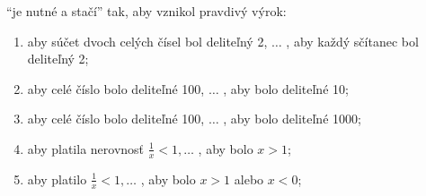 \begin{enumerate}
        \enquote{je nutné a stačí} tak, aby vznikol pravdivý výrok:
  \begin{enumerate}[label=\arabic*.]
    \item aby súčet dvoch celých čísel bol deliteľný 2, $\ldots$ , aby každý
          sčítanec bol deliteľný 2;
    \item aby celé číslo bolo deliteľné 100, $\ldots$ , aby bolo deliteľné 10;
    \item aby celé číslo bolo deliteľné 100, $\ldots$ , aby bolo deliteľné
          1000;
    \item aby platila nerovnosť $\frac{1}{x} < 1, \ldots$ , aby bolo $x > 1$;
    \item aby platilo $\frac{1}{x} < 1, \ldots$ , aby bolo $x > 1$ alebo
          $x < 0$;
  \end{enumerate}
\end{enumerate}

